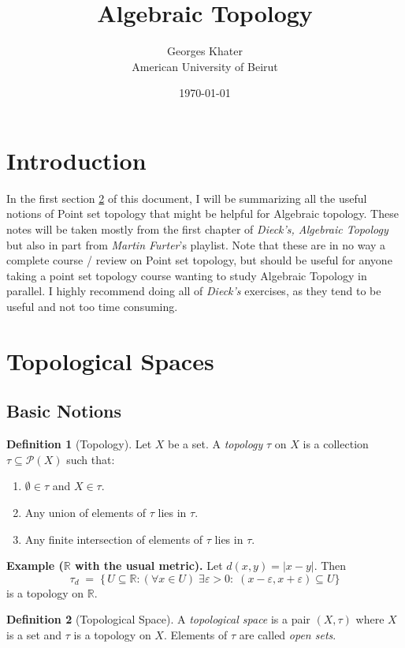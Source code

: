 \documentclass[11pt,a4paper]{article}
\title{\LARGE\bfseries Algebraic Topology}
\author{Georges Khater \\ \small American University of Beirut}
\date{\today}
\theoremstyle{definition}
\newtheorem{definition}{Definition}[section]
\theoremstyle{plain}
\theoremstyle{remark}
\newcommand{\R}{\mathbb{R}}
\begin{document}
\maketitle
\tableofcontents
\bigskip

\section{Introduction} 
In the first section \ref{sec:Topological-spaces} of this document, I will be summarizing all the useful notions of Point set topology that might be helpful for Algebraic topology. 
These notes will be taken mostly from the first chapter of \emph{Dieck's, Algebraic Topology} but also in part from  \emph{Martin Furter}'s playlist. Note that these are in no way a complete 
course / review on Point set topology, but should be useful for anyone taking a point set topology course wanting to study Algebraic Topology in parallel. I highly recommend doing all of \emph{Dieck's} 
exercises, as they tend to be useful and not too time consuming. 

\section{Topological Spaces} \label{sec:Topological-spaces}

\subsection{Basic Notions} 
\begin{definition}[Topology]
Let \(X\) be a set.  A {\it topology} \(\tau\) on \(X\) is a collection \(\tau\subseteq\mathcal P(X)\) such that:
\begin{enumerate}
  \item \(\emptyset\in\tau\) and \(X\in\tau\).
  \item Any union of elements of \(\tau\) lies in \(\tau\).
  \item Any finite intersection of elements of \(\tau\) lies in \(\tau\).
\end{enumerate}
\end{definition}

\noindent\textbf{Example (\(\R\) with the usual metric).}
Let \(d(x,y)=|x-y|\).  Then
\[
  \tau_d \;=\;\{\,U\subseteq\R : (\forall x\in U)\;\exists\varepsilon>0:\;(x-\varepsilon,x+\varepsilon)\subseteq U\}
\]
is a topology on \(\R\).

\begin{definition}[Topological Space]
A {\it topological space} is a pair \((X,\tau)\) where \(X\) is a set and \(\tau\) is a topology on \(X\).  Elements of \(\tau\) are called {\it open sets}.
\end{definition}
\end{document}
